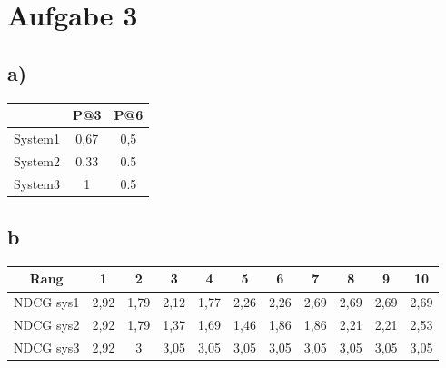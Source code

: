 \section*{Aufgabe 3}

\subsection*{a)}
\begin{center}
\begin{tabular}{|c|c|c|}
\hline & P@3 & P@6\\
\hline System1 & 0,67 & 0,5 \\
\hline System2 & 0.33 & 0.5 \\
\hline System3 & 1 & 0.5 \\
\hline
\end{tabular}
\end{center}

\subsection*{b}
\begin{tabular}{|c|c|c||c|c|c||c|c|c||c|c|}
\hline Rang 	& 1 & 2 	& 3 & 4 & 5 & 6 & 7 & 8 & 9 & 10\\

\hline NDCG sys1& 2,92 & 1,79 & 2,12 & 1,77 & 2,26 & 2,26 & 2,69 & 2,69 & 2,69 & 2,69\\
\hline NDCG sys2& 2,92 & 1,79 & 1,37 & 1,69 & 1,46 & 1,86 & 1,86 & 2,21 & 2,21 & 2,53\\
\hline NDCG sys3& 2,92 & 3 & 3,05 & 3,05 & 3,05 & 3,05 & 3,05 & 3,05 & 3,05 & 3,05\\
\hline
\end{tabular}